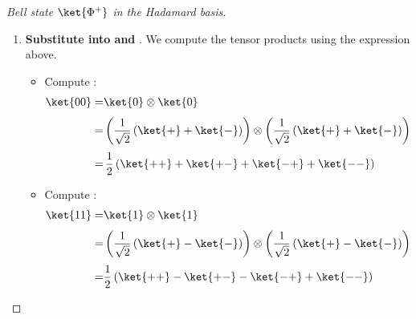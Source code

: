 \begin{examplebox}
\begin{proof}[Bell state $\ket{\Phi^{+}}$ in the Hadamard basis]
\begin{enumerate}
            \item \textbf{Substitute into  and }. We compute the tensor products using the expression above.
            \begin{itemize}
                \item Compute :
                \begin{equation*}
                    \begin{aligned}
                        \ket{00} =& \ket{0} \otimes \ket{0} \\[.3em]
                        =& \left( \dfrac{1}{\sqrt{2}} \left(\ket{+} + \ket{-}\right) \right)
                            \otimes
                            \left( \dfrac{1}{\sqrt{2}} \left(\ket{+} + \ket{-}\right) \right) \\[.3em]
                        =& \,\dfrac{1}{2} \left(\ket{++} + \ket{+-} + \ket{-+} + \ket{--}\right)
                    \end{aligned}
                \end{equation*}
                \item Compute :
                \begin{equation*}
                    \begin{aligned}
                        \ket{11} =& \ket{1} \otimes \ket{1} \\[.3em]
                        =& \left( \dfrac{1}{\sqrt{2}} \left(\ket{+} - \ket{-}\right) \right)
                            \otimes
                            \left( \dfrac{1}{\sqrt{2}} \left(\ket{+} - \ket{-}\right) \right) \\[.3em]
                        =& \dfrac{1}{2} \left(\ket{++} - \ket{+-} - \ket{-+} + \ket{--}\right)
                    \end{aligned}
                \end{equation*}
            \end{itemize}


\end{enumerate}
\end{proof}
\end{examplebox}
